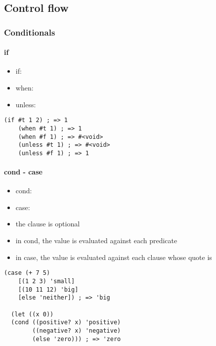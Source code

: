 \documentclass[a4paper,landscape,10pt]{article}
\begin{document}
\begin{multicols*}{2}
  \subsection{Control flow}

  \subsubsection{Conditionals}

  \paragraph{if}

  \begin{itemize}
    \item if: 
    \item when: 
    \item unless: 
  \end{itemize}

  \begin{lstlisting}[language=Racket]
    (if #t 1 2) ; => 1
    (when #t 1) ; => 1
    (when #f 1) ; => #<void>
    (unless #t 1) ; => #<void>
    (unless #f 1) ; => 1
  \end{lstlisting}

  \paragraph{cond - case}

  \begin{itemize}
    \item cond: 
    \item case: 
    \item the  clause is optional
    \item in cond, the value is evaluated against each predicate
    \item in case, the value is evaluated against each clause whose quote is 
  \end{itemize}

  \begin{lstlisting}[language=Racket]
  (case (+ 7 5)
    [(1 2 3) 'small]
    [(10 11 12) 'big]
    [else 'neither]) ; => 'big

  (let ((x 0))
  (cond ((positive? x) 'positive)
        ((negative? x) 'negative)
        (else 'zero))) ; => 'zero
  \end{lstlisting}


\end{multicols*}
\end{document}
